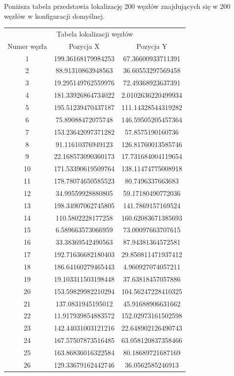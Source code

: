 \documentclass[a4paper,12pt,twoside,openany]{report}
\begin{document}
Poniższa tabela przedstawia lokalizację 200 węzłów znajdujących się w 200 węzłów w konfiguracji domyślnej.
\begin{longtable}{*{3}{c}}
\toprule
\multicolumn{3}{c}{Tabela lokalizacji węzłów} \\
Numer węzła	& Pozycja X	& Pozycja Y \\
\midrule
1	& 199.36168179984253	& 67.36600933711391	\\
2	& 88.91310863948563	& 36.60553297569458	\\
3	& 19.295149762559976	& 72.49368923637391	\\
4	& 181.33926864734022	& 2.0102636220499934	\\
5	& 195.51239470437187	& 111.14328544319282	\\
6	& 75.89088472075748	& 146.59505205457364	\\
7	& 153.23642097371282	& 57.8575190160736	\\
8	& 91.11610376949123	& 126.81760013585746	\\
9	& 22.168573090360173	& 17.731684004119654	\\
10	& 171.53390619509764	& 138.11474775008918	\\
11	& 178.78074650585523	& 80.7496337663683	\\
12	& 34.99559928880805	& 59.17180490772036	\\
13	& 198.34907062745805	& 141.7869157169524	\\
14	& 110.5802228177258	& 160.62083671385693	\\
15	& 6.589663573066959	& 73.00097663707615	\\
16	& 33.38369542490563	& 87.94381364572581	\\
17	& 192.71636682180403	& 29.850811471937412	\\
18	& 186.64160279465443	& 4.960927074057211	\\
19	& 19.103311503198448	& 37.63818457057886	\\
20	& 153.59829982210294	& 104.56247228410325	\\
21	& 137.0831945195012	& 45.91688906631662	\\
22	& 11.917939854883572	& 152.02973161502598	\\
23	& 142.44031003121216	& 22.648902126490743	\\
24	& 167.57507873516485	& 63.058120837358466	\\
25	& 163.86836016322584	& 80.18689721687169	\\
26	& 129.33679162442746	& 36.0562585246913	\\

\end{longtable}
\end{document}
